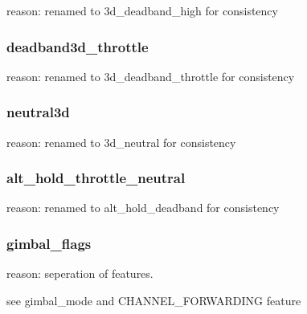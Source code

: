 reason\+: renamed to {\ttfamily 3d\+\_\+deadband\+\_\+high} for consistency

\subsubsection*{deadband3d\+\_\+throttle}

reason\+: renamed to {\ttfamily 3d\+\_\+deadband\+\_\+throttle} for consistency

\subsubsection*{neutral3d}

reason\+: renamed to {\ttfamily 3d\+\_\+neutral} for consistency

\subsubsection*{alt\+\_\+hold\+\_\+throttle\+\_\+neutral}

reason\+: renamed to {\ttfamily alt\+\_\+hold\+\_\+deadband} for consistency

\subsubsection*{gimbal\+\_\+flags}

reason\+: seperation of features.

see {\ttfamily gimbal\+\_\+mode} and {\ttfamily C\+H\+A\+N\+N\+E\+L\+\_\+\+F\+O\+R\+W\+A\+R\+D\+I\+N\+G} feature 
